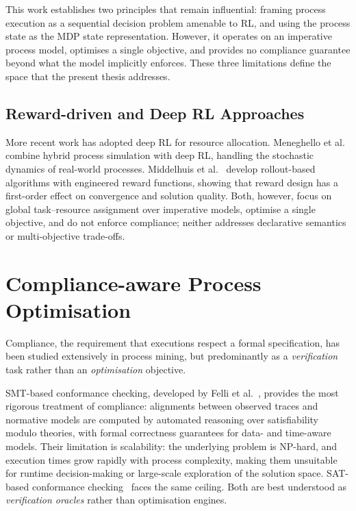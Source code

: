 This work establishes two principles that remain influential: framing
process execution as a sequential decision problem amenable to \ac{RL},
and using the process state as the \ac{MDP} state representation.
However, it operates on an imperative process model, optimises a single
objective, and provides no compliance guarantee beyond what the model
implicitly enforces. These three limitations define the space that the
present thesis addresses.

\subsection{Reward-driven and Deep RL Approaches}

More recent work has adopted deep \ac{RL} for resource allocation.
Meneghello et al.~\cite{Meneghello2024OptimizingLearning} combine hybrid
process simulation with deep \ac{RL}, handling the stochastic dynamics
of real-world processes. Middelhuis et
al.~\cite{Middelhuis2025LearningProcesses} develop rollout-based
algorithms with engineered reward functions, showing that reward design
has a first-order effect on convergence and solution quality. Both,
however, focus on global task--resource assignment over imperative
models, optimise a single objective, and do not enforce compliance;
neither addresses declarative semantics or multi-objective trade-offs.

\section{Compliance-aware Process Optimisation}
\label{sec:lit_compliance}

Compliance, the requirement that executions respect a formal
specification, has been studied extensively in process mining, but
predominantly as a \emph{verification} task rather than an
\emph{optimisation} objective.

\ac{SMT}-based conformance checking, developed by Felli et
al.~\cite{Felli2023Data-awareSMT, Felli2023Multi-perspectiveApproach},
provides the most rigorous treatment of compliance: alignments between
observed traces and normative models are computed by automated reasoning
over satisfiability modulo theories, with formal correctness guarantees
for data- and time-aware models. Their limitation is scalability: the
underlying problem is NP-hard, and execution times grow rapidly with
process complexity, making them unsuitable for runtime decision-making
or large-scale exploration of the solution space. SAT-based conformance
checking~\cite{Boltenhagen2021OptimizedArtefacts} faces the same
ceiling. Both are best understood as \emph{verification oracles} rather
than optimisation engines.

